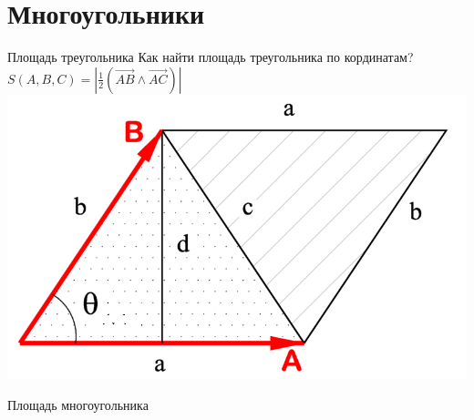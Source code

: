 \documentclass{beamer}
\begin{document}
\section{Многоугольники}
\begin{frame}{Площадь треугольника}
    Как найти площадь треугольника по кординатам?
    \pause
    $S(A,B,C)=\left|\frac{1}{2}(\overrightarrow{AB}\wedge \overrightarrow{AC})\right|$\\
    \includegraphics[scale = 0.2]{Magnitude_cross_product.png}
\end{frame}

\begin{frame}{Площадь многоугольника}
    \begin{figure}
    \end{figure}
\end{frame}
\end{document}
